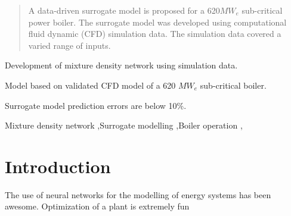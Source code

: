 \documentclass[a4paper,fleqn]{cas-sc}
\begin{document}


\begin{abstract}
A data-driven surrogate model is proposed for a 620$MW_e$ sub-critical power boiler. The surrogate model was developed using computational fluid dynamic (CFD) simulation data. The simulation data covered a varied range of inputs.
\end{abstract}


\begin{highlights}
\item Development of mixture density network using simulation data.
\item Model based on validated CFD model of a 620 $MW_e$ sub-critical boiler.
\item Surrogate model prediction errors are below 10\%.
\end{highlights}

\begin{keywords}
Mixture density network \sep Surrogate modelling \sep Boiler operation \sep 
\end{keywords}

\maketitle

\section{Introduction}\label{intro}

The use of neural networks for the modelling of energy systems has been awesome. Optimization of a plant is extremely fun
\end{document}
